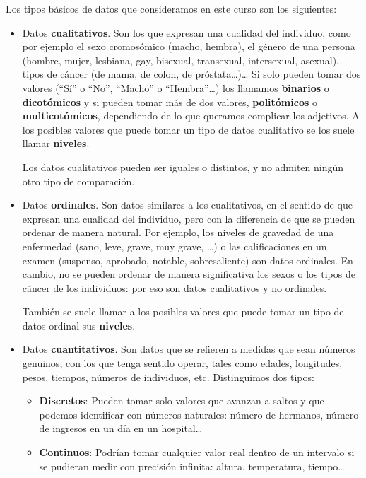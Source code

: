 \documentclass[
  letterpaper,
  DIV=11,
  numbers=noendperiod]{scrreprt}
\begin{document}
Los tipos básicos de datos que consideramos en este curso son los
siguientes:

\begin{itemize}
\item
  Datos \textbf{cualitativos}. Son los que expresan una cualidad del
  individuo, como por ejemplo el sexo cromosómico (macho, hembra), el
  género de una persona (hombre, mujer, lesbiana, gay, bisexual,
  transexual, intersexual, asexual), tipos de cáncer (de mama, de colon,
  de próstata\ldots)\ldots{} Si solo pueden tomar dos valores (``Sí'' o
  ``No'', ``Macho'' o ``Hembra''\ldots) los llamamos \textbf{binarios} o
  \textbf{dicotómicos} y si pueden tomar más de dos valores,
  \textbf{politómicos} o \textbf{multicotómicos}, dependiendo de lo que
  queramos complicar los adjetivos. A los posibles valores que puede
  tomar un tipo de datos cualitativo se los suele llamar
  \textbf{niveles}.

  Los datos cualitativos pueden ser iguales o distintos, y no admiten
  ningún otro tipo de comparación.
\item
  Datos \textbf{ordinales}. Son datos similares a los cualitativos, en
  el sentido de que expresan una cualidad del individuo, pero con la
  diferencia de que se pueden ordenar de manera natural. Por ejemplo,
  los niveles de gravedad de una enfermedad (sano, leve, grave, muy
  grave, \ldots) o las calificaciones en un examen (suspenso, aprobado,
  notable, sobresaliente) son datos ordinales. En cambio, no se pueden
  ordenar de manera significativa los sexos o los tipos de cáncer de los
  individuos: por eso son datos cualitativos y no ordinales.

  También se suele llamar a los posibles valores que puede tomar un tipo
  de datos ordinal sus \textbf{niveles}.
\item
  Datos \textbf{cuantitativos}. Son datos que se refieren a medidas que
  sean números genuinos, con los que tenga sentido operar, tales como
  edades, longitudes, pesos, tiempos, números de individuos, etc.
  Distinguimos dos tipos:

  \begin{itemize}
  \item
    \textbf{Discretos}: Pueden tomar solo valores que avanzan a saltos y
    que podemos identificar con números naturales: número de hermanos,
    número de ingresos en un día en un hospital\ldots{}
  \item
    \textbf{Continuos}: Podrían tomar cualquier valor real dentro de un
    intervalo si se pudieran medir con precisión infinita: altura,
    temperatura, tiempo\ldots{}
  \end{itemize}
\end{itemize}
\end{document}

